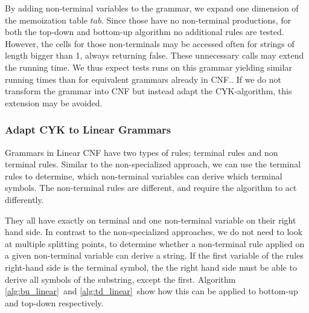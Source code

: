 By adding non-terminal variables to the grammar, we expand one dimension of the memoization table $tab$.
Since those have no non-terminal productions, for both the top-down and bottom-up algorithm no additional rules are tested.
However, the cells for those non-terminals may be accessed often for strings of length bigger than 1, always returning false.
These unnecessary calls may extend the running time.
We thus expect tests runs on this grammar yielding similar running times than for equivalent grammars already in CNF..
If we do not transform the grammar into CNF but instead adapt the CYK-algorithm, this extension may be avoided.

\subsubsection{Adapt CYK to Linear Grammars}
Grammars in Linear CNF have two types of rules; terminal rules and non terminal rules.
Similar to the non-specialized approach, we can use the terminal rules to determine, which non-terminal variables can derive which terminal symbols.
The non-terminal rules are different, and require the algorithm to act differently.

They all have exactly on terminal and one non-terminal variable on their right hand side.
In contrast to the non-specialized approaches, we do not need to look at multiple splitting points, to determine whether a non-terminal rule applied on a given non-terminal variable can derive a string.
If the first variable of the rules right-hand side is the terminal symbol, the the right hand side must be able to derive all symbols of the substring, except the first.
Algorithm \ref{alg:bu_linear}~and \ref{alg:td_linear}~show how this can be applied to bottom-up and top-down respectively.

